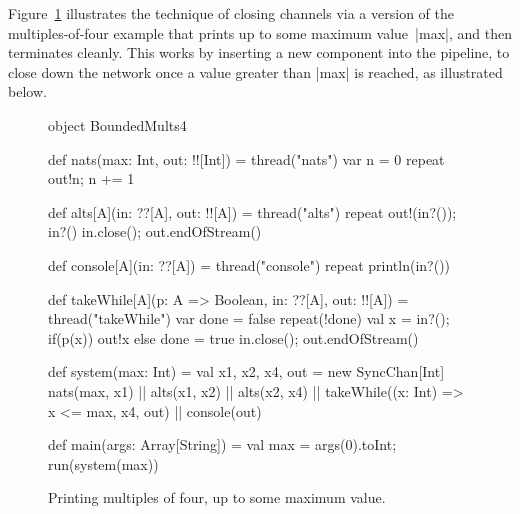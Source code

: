 Figure~\ref{fig:BoundedMults4} illustrates the technique of closing channels
via a version of the multiples-of-four example that prints up to some maximum
value~|max|, and then terminates cleanly.  This works by inserting a new
component into the pipeline, to close down the network once a value greater
than |max| is reached, as illustrated below.
%
\begin{center}
\end{center}


\begin{figure}
\begin{scala}
object BoundedMults4{
  def nats(max: Int, out: !![Int]) = thread("nats"){ 
    var n = 0
    repeat{ out!n; n += 1 }
  }

  def alts[A](in: ??[A], out: !![A]) = thread("alts"){ 
    repeat{ out!(in?()); in?() }
    in.close(); out.endOfStream()
  }

  def console[A](in: ??[A]) = thread("console"){ repeat{ println(in?()) } }

  def takeWhile[A](p: A => Boolean, in: ??[A], out: !![A]) = thread("takeWhile"){
    var done = false
    repeat(!done){ val x = in?(); if(p(x)) out!x else done = true }
    in.close(); out.endOfStream()
  }

  def system(max: Int) = {
    val x1, x2, x4, out = new SyncChan[Int]
    nats(max, x1) || alts(x1, x2) || alts(x2, x4) || 
      takeWhile((x: Int) => x <= max, x4, out) || console(out)
  }

  def main(args: Array[String]) = {
    val max = args(0).toInt; run(system(max))
  }
}
\end{scala}
\caption{Printing multiples of four, up to some maximum value.}
\label{fig:BoundedMults4}
\end{figure}

